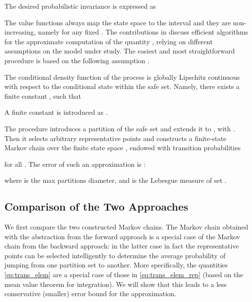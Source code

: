 \documentclass{LMCS}
\begin{document}
The desired probabilistic invariance is expressed as 

The value functions always map the state space to the interval  and they are non-increasing, 
namely  for any fixed .  
The contributions in \cite{APKL10,SA11,SAH12,SA12} discuss efficient algorithms for the approximate computation of the quantity ,   
relying on different assumptions on the model under study. 
The easiest and most straightforward procedure is based on the following assumption \cite{APKL10}. 
\begin{asm}
\label{ass:back_cond_kernel}
The conditional density function of the process is globally Lipschitz continuous with respect to the conditional state within the safe set.   
Namely, there exists a finite constant , such that

A finite constant  is introduced as 
.
\end{asm}

The procedure introduces a partition of the safe set  and extends it to , 
with .
Then it selects arbitrary representative points 
and constructs a finite-state Markov chain  over the finite state space , 
endowed with transition probabilities

for all . The error of such an approximation is \cite{SAH12}:
 
where  is the max partitions diameter, 
and  is the Lebesgue measure of set . 

\subsection{Comparison of the Two Approaches}
\label{subsec:compare}

We first compare the two constructed Markov chains.
The Markov chain  obtained with the abstraction from the forward approach is a special case of the Markov chain  from the backward approach: in the latter case in fact the representative points can be selected intelligently to determine the average probability of jumping from one partition set to another. 
More specifically, the quantities \eqref{eq:trans_elem} are a special case of those in \eqref{eq:trans_elem_rep} (based on the mean value theorem for integration).
We will show that this leads to a less conservative (smaller) error bound for the approximation. 
\end{document}
